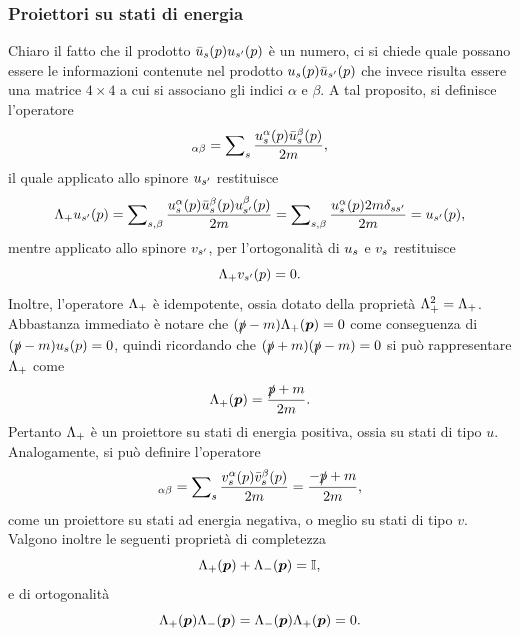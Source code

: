 \subsubsection{Proiettori su stati di energia}
Chiaro il fatto che il prodotto $\bar{u}_s(p)u_{s'}(p)$ è un numero, ci si chiede quale possano essere le informazioni contenute nel prodotto $u_s(p)\bar{u}_{s'}(p)$ che invece risulta essere una matrice $4\times4$ a cui si associano gli indici $\alpha$ e $\beta$. A tal proposito, si definisce l'operatore
\begin{equation}
    [\ML_+(\vp)]_{\alpha\beta} = \nsum_s\frac{\sdu^\alpha(p)\sdub^\beta(p)}{2m},
\end{equation}
il quale applicato allo spinore $u_{s'}$ restituisce
\begin{equation}
    \Lambda_+u_{s'}(p) = \sum\nolimits_{s,\beta}\frac{u_s^\alpha(p)\bar{u}_s^\beta(p)u_{s'}^\beta(p)}{2m} = \sum\nolimits_{s,\beta}\frac{u_s^\alpha(p)2m\delta_{ss'}}{2m} = u_{s'}(p),
\end{equation}
mentre applicato allo spinore $v_{s'}$, per l'ortogonalità di $u_s$ e $v_s$ restituisce
\begin{equation}
    \Lambda_+v_{s'}(p) = 0.
\end{equation}
Inoltre, l'operatore $\Lambda_+$ è idempotente, ossia dotato della proprietà $\Lambda_+^2 = \Lambda_+$. Abbastanza immediato è notare che $(\slashed{p} - m)\Lambda_+(\bm{p}) = 0$ come conseguenza di $(\slashed{p} - m)u_s(p) = 0$, quindi ricordando che $(\slashed{p} + m)(\slashed{p} - m) = 0$ si può rappresentare $\Lambda_+$ come 
\begin{equation}
    \Lambda_+(\bm{p}) = \frac{\slashed{p} + m}{2m}.
\end{equation}
Pertanto $\Lambda_+$ è un proiettore su stati di energia positiva, ossia su stati di tipo $u$. Analogamente, si può definire l'operatore
\begin{equation}
    [\ML_-(\vp)]_{\alpha\beta} = \nsum_s\frac{\sdv^\alpha(p)\sdvb^\beta(p)}{2m} = \frac{-\slp + m}{2m},
\end{equation}
come un proiettore su stati ad energia negativa, o meglio su stati di tipo $v$. Valgono inoltre le seguenti proprietà di completezza
\begin{equation}
    \Lambda_+(\bm{p}) + \Lambda_-(\bm{p}) = \mathbb{I},
\end{equation}
e di ortogonalità 
\begin{equation}
    \Lambda_+(\bm{p})\Lambda_-(\bm{p}) = \Lambda_-(\bm{p})\Lambda_+(\bm{p}) = 0.
\end{equation}

